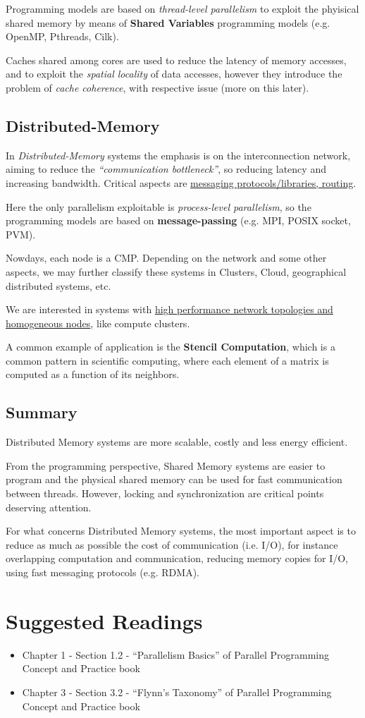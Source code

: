 Programming models are based on \textit{thread-level parallelism} to exploit the phyisical shared memory by means of \textbf{Shared Variables} programming models (e.g. OpenMP, Pthreads, Cilk).

Caches shared among cores are used to reduce the latency of memory accesses, and to exploit the \textit{spatial locality} of data accesses, however they introduce the problem of \textit{cache coherence}, with respective issue (more on this later).

\subsection{Distributed-Memory}
In \textit{Distributed-Memory} systems the emphasis is on the interconnection network, aiming to reduce the \textit{``communication bottleneck''}, so reducing latency and increasing bandwidth.
Critical aspects are \ul{messaging protocols/libraries, routing}.

Here the only parallelism exploitable is \textit{process-level parallelism}, so the programming models are based on \textbf{message-passing} (e.g. MPI, POSIX socket, PVM).
\nl

Nowdays, each node is a CMP.
Depending on the network and some other aspects, we may further classify these systems in Clusters, Cloud, geographical distributed systems, etc.

We are interested in systems with \ul{high performance network topologies and homogeneous nodes}, like compute clusters.

A common example of application is the \textbf{Stencil Computation}, which is a common pattern in scientific computing, where each element of a matrix is computed as a function of its neighbors.

\subsection{Summary}
Distributed Memory systems are more scalable, costly and less energy efficient.

From the programming perspective, Shared Memory systems are easier to program and the physical shared memory can be used for fast communication between threads.
However, locking and synchronization are critical points deserving attention.

For what concerns Distributed Memory systems, the most important aspect is to reduce as much as possible the cost of communication (i.e. I/O), for instance overlapping computation and communication, reducing memory copies for I/O, using fast messaging protocols (e.g. RDMA).

\section{Suggested Readings}
\begin{itemize}
   \item 
   Chapter 1 - Section 1.2 - ``Parallelism Basics'' of Parallel Programming Concept and Practice book
   
   \item
   Chapter 3 - Section 3.2 - ``Flynn's Taxonomy'' of Parallel Programming Concept and Practice book
\end{itemize}